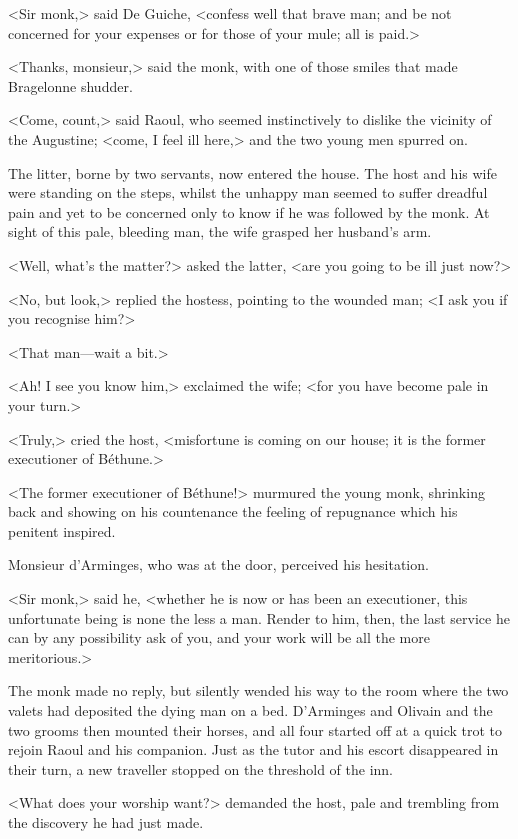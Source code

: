 <Sir monk,> said De Guiche, <confess well that brave man; and be not concerned for your expenses or for those of your mule; all is paid.>

<Thanks, monsieur,> said the monk, with one of those smiles that made Bragelonne shudder.

<Come, count,> said Raoul, who seemed instinctively to dislike the vicinity of the Augustine; <come, I feel ill here,> and the two young men spurred on.

The litter, borne by two servants, now entered the house. The host and his wife were standing on the steps, whilst the unhappy man seemed to suffer dreadful pain and yet to be concerned only to know if he was followed by the monk. At sight of this pale, bleeding man, the wife grasped her husband's arm.

<Well, what's the matter?> asked the latter, <are you going to be ill just now?>

<No, but look,> replied the hostess, pointing to the wounded man; <I ask you if you recognise him?>

<That man—wait a bit.>

<Ah! I see you know him,> exclaimed the wife; <for you have become pale in your turn.>

<Truly,> cried the host, <misfortune is coming on our house; it is the former executioner of Béthune.>

<The former executioner of Béthune!> murmured the young monk, shrinking back and showing on his countenance the feeling of repugnance which his penitent inspired.

Monsieur d'Arminges, who was at the door, perceived his hesitation.

<Sir monk,> said he, <whether he is now or has been an executioner, this unfortunate being is none the less a man. Render to him, then, the last service he can by any possibility ask of you, and your work will be all the more meritorious.>

The monk made no reply, but silently wended his way to the room where the two valets had deposited the dying man on a bed. D'Arminges and Olivain and the two grooms then mounted their horses, and all four started off at a quick trot to rejoin Raoul and his companion. Just as the tutor and his escort disappeared in their turn, a new traveller stopped on the threshold of the inn.

<What does your worship want?> demanded the host, pale and trembling from the discovery he had just made.

